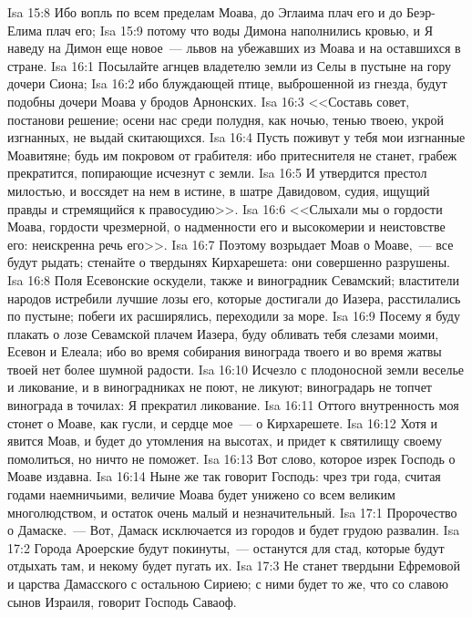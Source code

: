 \vs Isa 15:8 Ибо вопль по всем пределам Моава, до Эглаима плач его и до Беэр-Елима плач его;
\vs Isa 15:9 потому что воды Димона наполнились кровью, и Я наведу на Димон еще новое~--- львов на убежавших из Моава и на оставшихся в стране.
\vs Isa 16:1 Посылайте агнцев владетелю земли из Селы в пустыне на гору дочери Сиона;
\vs Isa 16:2 ибо блуждающей птице, выброшенной из гнезда, будут подобны дочери Моава у бродов Арнонских.
\vs Isa 16:3 <<Составь совет, постанови решение; осени нас среди полудня, как ночью, тенью твоею, укрой изгнанных, не выдай скитающихся.
\vs Isa 16:4 Пусть поживут у тебя мои изгнанные Моавитяне; будь им покровом от грабителя: ибо притеснителя не станет, грабеж прекратится, попирающие исчезнут с земли.
\vs Isa 16:5 И утвердится престол милостью, и воссядет на нем в истине, в шатре Давидовом, судия, ищущий правды и стремящийся к правосудию>>.
\vs Isa 16:6 <<Слыхали мы о гордости Моава, гордости чрезмерной, о надменности его и высокомерии и неистовстве его: неискренна речь его>>.
\vs Isa 16:7 Поэтому возрыдает Моав о Моаве,~--- все будут рыдать; стенайте о твердынях Кирхарешета: они совершенно разрушены.
\vs Isa 16:8 Поля Есевонские оскудели, также и виноградник Севамский; властители народов истребили лучшие лозы его, которые достигали до Иазера, расстилались по пустыне; побеги их расширялись, переходили за море.
\vs Isa 16:9 Посему  я буду плакать о лозе Севамской плачем Иазера, буду обливать тебя слезами моими, Есевон и Елеала; ибо во время собирания винограда твоего и во время жатвы твоей нет более шумной радости.
\vs Isa 16:10 Исчезло с плодоносной земли веселье и ликование, и в виноградниках не поют, не ликуют; виноградарь не топчет винограда в точилах: Я прекратил ликование.
\vs Isa 16:11 Оттого внутренность моя стонет о Моаве, как гусли, и сердце мое~--- о Кирхарешете.
\vs Isa 16:12 Хотя и явится Моав, и будет до утомления  на высотах, и придет к святилищу своему помолиться, но ничто не поможет.
\rsbpar\vs Isa 16:13 Вот слово, которое изрек Господь о Моаве издавна.
\vs Isa 16:14 Ныне же так говорит Господь: чрез три года, считая годами наемничьими, величие Моава будет унижено со всем великим многолюдством, и остаток  очень малый и незначительный.
\vs Isa 17:1 Пророчество о Дамаске.~--- Вот, Дамаск исключается из  городов и будет грудою развалин.
\vs Isa 17:2 Города Ароерские будут покинуты,~--- останутся для стад, которые будут отдыхать там, и некому будет пугать их.
\vs Isa 17:3 Не станет твердыни Ефремовой и царства Дамасского с остальною Сириею; с ними будет то же, что со славою сынов Израиля, говорит Господь Саваоф.
